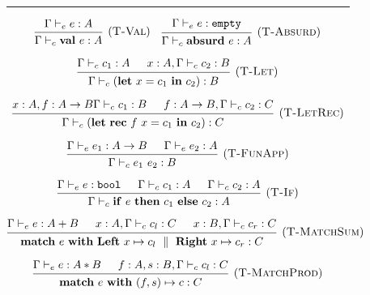 \documentclass[class=article, crop=false]{standalone}
\newcommand{\dmid}{\ \parallel \ }
\newcommand{\effLeft}{\mathbf{Left}\ }
\newcommand{\effRight}{\mathbf{Right\ }}
\newcommand{\effVal}{\mathbf{val}\ }
\newcommand{\effWith}{\mathbf{with}\ }
\newcommand{\effIf}{\mathbf{if}\ }
\newcommand{\effThen}{\ \mathbf{then}\ }
\newcommand{\effElse}{\ \mathbf{else}\ }
\newcommand{\effAbsurd}{\mathbf{absurd}\ }
\newcommand{\effMatch}{\mathbf{match}\ }
\newcommand{\effLet}{\mathbf{let}\ }
\newcommand{\effIn}{\ \mathbf{in}\ }
\newcommand{\effRec}{\mathbf{rec}\ }
\newcommand{\boolType}{\mathtt{bool}}
\newcommand{\emptyType}{\mathtt{empty}}
\begin{document}
\begin{figure}[H]
    \rule[0.4pt]{\textwidth}{0.4pt}



    $$
    \begin{prooftree}
      \hypo{\Gamma \vdash_e e : A}
      \infer1[(\textsc{T-Val})]{\Gamma \vdash_c \effVal e : A}
    \end{prooftree}
    \quad
    \begin{prooftree}
      \hypo{\Gamma \vdash_e e : \emptyType}
      \infer1[(\textsc{T-Absurd})]{\Gamma \vdash_c \effAbsurd e : A}
    \end{prooftree}
    $$
    
    $$
    \begin{prooftree}
      \hypo{\Gamma \vdash_c c_1 : A}
      \hypo{x : A, \Gamma \vdash_c c_2 : B}
      \infer2[(\textsc{T-Let})]{\Gamma \vdash_c (\effLet x = c_1 \effIn c_2) : B}
    \end{prooftree}
    $$
    
    $$
    \begin{prooftree}
      \hypo{x : A, f : A \to B \Gamma \vdash_c c_1 : B}
      \hypo{f : A \to B, \Gamma \vdash_c c_2 : C}
      \infer2[(\textsc{T-LetRec})]{\Gamma \vdash_c (\effLet \effRec f\ x = c_1 \effIn c_2) : C}
    \end{prooftree}
    $$
    
    $$
    \begin{prooftree}
      \hypo{\Gamma \vdash_e e_1 : A \to B}
      \hypo{\Gamma \vdash_e e_2 : A}
      \infer2[(\textsc{T-FunApp})]{\Gamma \vdash_c e_1\ e_2 : B}
    \end{prooftree}
    $$
    
    $$
    \begin{prooftree}
      \hypo{\Gamma \vdash_e e : \boolType}
      \hypo{\Gamma \vdash_c c_1 : A}
      \hypo{\Gamma \vdash_c c_2 : A}
      \infer3[(\textsc{T-If})]{\Gamma \vdash_c \effIf e \effThen c_1 \effElse c_2 : A}
    \end{prooftree}
    $$
    
    $$
    \begin{prooftree}
      \hypo{\Gamma \vdash_e e : A + B}
      \hypo{x : A, \Gamma \vdash_c c_l : C}
      \hypo{x : B, \Gamma \vdash_c c_r : C}
      \infer3[(\textsc{T-MatchSum})]{\effMatch e\ \effWith \effLeft x \mapsto c_l \dmid \effRight x \mapsto c_r : C}
    \end{prooftree}
    $$
    
    $$
    \begin{prooftree}
      \hypo{\Gamma \vdash_e e : A * B}
      \hypo{f : A, s: B, \Gamma \vdash_c c_l : C}
      \infer2[(\textsc{T-MatchProd})]{\effMatch e\ \effWith (f,s) \mapsto c : C}
    \end{prooftree}
    $$


\end{figure}
\end{document}
